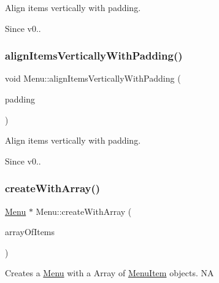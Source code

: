 Align items vertically with padding. \begin{DoxySince}{Since}
v0.. 
\end{DoxySince}
\mbox{\label{classMenu_a092a7f04579a919e723587d8cbe1c45d}} 
\subsubsection{\texorpdfstring{align\+Items\+Vertically\+With\+Padding()}{alignItemsVerticallyWithPadding()}\hspace{0.1cm}{\footnotesize\ttfamily [2/2]}}
{\footnotesize\ttfamily void Menu\+::align\+Items\+Vertically\+With\+Padding (\begin{DoxyParamCaption}\item[{float}]{padding }\end{DoxyParamCaption})}

Align items vertically with padding. \begin{DoxySince}{Since}
v0.. 
\end{DoxySince}
\mbox{\label{classMenu_a31a4c48de52e869c966c66520e66bd55}} 
\subsubsection{\texorpdfstring{create\+With\+Array()}{createWithArray()}\hspace{0.1cm}{\footnotesize\ttfamily [1/2]}}
{\footnotesize\ttfamily \hyperlink{classMenu}{Menu} $\ast$ Menu\+::create\+With\+Array (\begin{DoxyParamCaption}\item[{const \hyperlink{classVector}{Vector}$<$ \hyperlink{classMenuItem}{Menu\+Item} $\ast$$>$ \&}]{array\+Of\+Items }\end{DoxyParamCaption})\hspace{0.3cm}{\ttfamily [static]}}

Creates a \hyperlink{classMenu}{Menu} with a Array of \hyperlink{classMenuItem}{Menu\+Item} objects.  NA \mbox{\label{classMenu_a5b2c28ed0707d2524f489e86e5b2e2ca}} 
